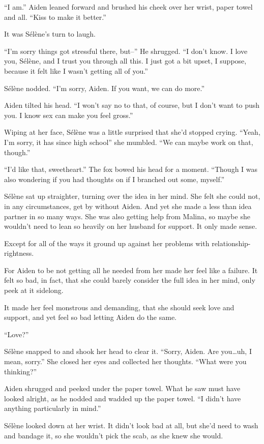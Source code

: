 ``I am.'' Aiden leaned forward and brushed his cheek over her wrist, paper towel and all. ``Kiss to make it better.''

It was Sélène's turn to laugh.

``I'm sorry things got stressful there, but--'' He shrugged. ``I don't know. I love you, Sélène, and I trust you through all this. I just got a bit upset, I suppose, because it felt like I wasn't getting all of you.''

Sélène nodded. ``I'm sorry, Aiden. If you want, we can do more.''

Aiden tilted his head. ``I won't say no to that, of course, but I don't want to push you. I know sex can make you feel gross.''

Wiping at her face, Sélène was a little surprised that she'd stopped crying. ``Yeah, I'm sorry, it has since high school'' she mumbled. ``We can maybe work on that, though.''

``I'd like that, sweetheart.'' The fox bowed his head for a moment. ``Though I was also wondering if you had thoughts on if I branched out some, myself.''

Sélène sat up straighter, turning over the idea in her mind. She felt she could not, in any circumstances, get by without Aiden. And yet she made a less than idea partner in so many ways. She was also getting help from Malina, so maybe she wouldn't need to lean so heavily on her husband for support. It only made sense.

Except for all of the ways it ground up against her problems with relationship-rightness.

For Aiden to be not getting all he needed from her made her feel like a failure. It felt so bad, in fact, that she could barely consider the full idea in her mind, only peek at it sidelong.

It made her feel monstrous and demanding, that she should seek love and support, and yet feel so bad letting Aiden do the same.

``Love?''

Sélène snapped to and shook her head to clear it. ``Sorry, Aiden. Are you\ldots{}uh, I mean, sorry.'' She closed her eyes and collected her thoughts. ``What were you thinking?''

Aiden shrugged and peeked under the paper towel. What he saw must have looked alright, as he nodded and wadded up the paper towel. ``I didn't have anything particularly in mind.''

Sélène looked down at her wrist. It didn't look bad at all, but she'd need to wash and bandage it, so she wouldn't pick the scab, as she knew she would.

